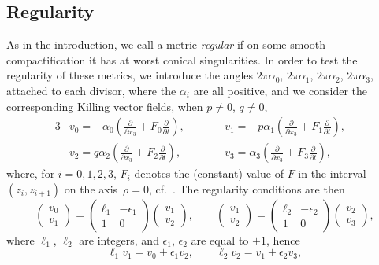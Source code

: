 \documentclass[10pt,a4paper]{amsart}
\numberwithin{equation}{section}
\begin{document}
\subsection{Regularity} As in the introduction, we call a metric \emph{regular} if on some smooth compactification it has at worst conical singularities. In order to test the regularity of these metrics, we introduce the angles $2 \pi \alpha _0$, $2 \pi \alpha _1$, $2 \pi \alpha _2$, $2 \pi \alpha _3$, attached to each divisor, where the $\alpha _i$ are all positive, and we consider the corresponding Killing vector fields, when $p \neq 0$, $q \neq 0$,
\begin{alignat}{3}
 & v _0 = - \alpha _0 \left(\frac{\partial}{\partial x _3} + F _0 \frac{\partial}{\partial t}\right), \qquad && v _1 = - p \alpha _1 \left(\frac{\partial}{\partial x _3} + F _1 \frac{\partial}{\partial t}\right),& \nonumber \\
& v _2 = q \alpha _2 \left(\frac{\partial}{\partial x _3} + F _2 \frac{\partial}{\partial t}\right), \qquad && v _3 = \alpha _3 \left(\frac{\partial}{\partial x _3} + F _3 \frac{\partial}{\partial t}\right),& \label{v-i}
 \end{alignat}
where, for $i = 0, 1, 2, 3$, $F _i$ denotes the (constant) value of $F$ in the interval $(z_i, z _{i + 1})$ on the axis~$\rho = 0$, cf.\ \cite[Lemma 7.1]{BG}. The regularity conditions are then
\[ \begin{pmatrix} v_0 \\ v_1 \end{pmatrix} = \begin{pmatrix} \ell _1 & - \epsilon _1 \\ 1 & 0 \end{pmatrix} \begin{pmatrix} v_1 \\ v_2 \end{pmatrix}, \qquad \begin{pmatrix} v_1 \\ v_2 \end{pmatrix} = \begin{pmatrix} \ell _2 & - \epsilon _2 \\ 1 & 0 \end{pmatrix} \begin{pmatrix} v_2 \\ v_3 \end{pmatrix},
\]
where $\ell _1$, $\ell _2$ are integers, and $\epsilon _1$, $\epsilon _2$ are equal to $\pm 1$, hence
\[ \ell _1 v_1 = v_0 + \epsilon _1 v_2, \qquad \ell _2 v_2 = v_1 + \epsilon _2 v_3, \]
\end{document}
